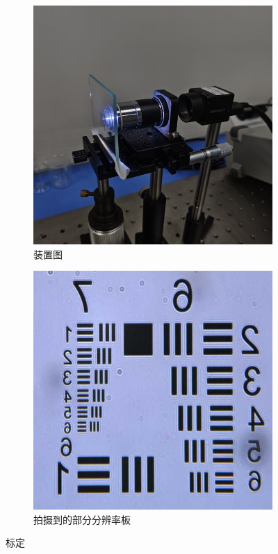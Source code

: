 \documentclass[a4paper]{report} %
\begin{document}
\begin{figure}[H]
    \centering
    \begin{subfigure}{0.45\textwidth}
        \includegraphics[width=\linewidth]{标定装置.jpg}
        \caption{装置图}
    \end{subfigure}
    \begin{subfigure}{0.45\textwidth}
        \includegraphics[width=\linewidth]{标定.jpg}
        \caption{拍摄到的部分分辨率板}
    \end{subfigure}

    \caption{标定}
    \label{fig:biaoding}
\end{figure}
\end{document}
